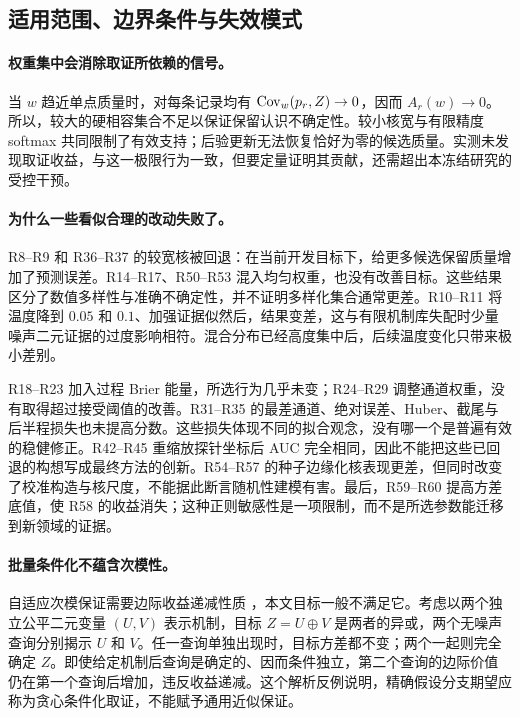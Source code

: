 \subsection{适用范围、边界条件与失效模式}
\label{sec:boundaries}
\paragraph{权重集中会消除取证所依赖的信号。}
当 $w$ 趋近单点质量时，对每条记录均有 $\operatorname{Cov}_w(p_r,Z)\to0$，因而 $A_r(w)\to0$。所以，较大的硬相容集合不足以保证保留认识不确定性。较小核宽与有限精度 softmax 共同限制了有效支持；后验更新无法恢复恰好为零的候选质量。实测未发现取证收益，与这一极限行为一致，但要定量证明其贡献，还需超出本冻结研究的受控干预。

\paragraph{为什么一些看似合理的改动失败了。}
R8--R9 和 R36--R37 的较宽核被回退：在当前开发目标下，给更多候选保留质量增加了预测误差。R14--R17、R50--R53 混入均匀权重，也没有改善目标。这些结果区分了数值多样性与准确不确定性，并不证明多样化集合通常更差。R10--R11 将温度降到 $0.05$ 和 $0.1$、加强证据似然后，结果变差，这与有限机制库失配时少量噪声二元证据的过度影响相符。混合分布已经高度集中后，后续温度变化只带来极小差别。

R18--R23 加入过程 Brier 能量，所选行为几乎未变；R24--R29 调整通道权重，没有取得超过接受阈值的改善。R31--R35 的最差通道、绝对误差、Huber、截尾与后半程损失也未提高分数。这些损失体现不同的拟合观念，没有哪一个是普遍有效的稳健修正。R42--R45 重缩放探针坐标后 AUC 完全相同，因此不能把这些已回退的构想写成最终方法的创新。R54--R57 的种子边缘化核表现更差，但同时改变了校准构造与核尺度，不能据此断言随机性建模有害。最后，R59--R60 提高方差底值，使 R58 的收益消失；这种正则敏感性是一项限制，而不是所选参数能迁移到新领域的证据。

\paragraph{批量条件化不蕴含次模性。}
自适应次模保证需要边际收益递减性质 \citep{golovin2011}，本文目标一般不满足它。考虑以两个独立公平二元变量 $(U,V)$ 表示机制，目标 $Z=U\oplus V$ 是两者的异或，两个无噪声查询分别揭示 $U$ 和 $V$。任一查询单独出现时，目标方差都不变；两个一起则完全确定 $Z$。即使给定机制后查询是确定的、因而条件独立，第二个查询的边际价值仍在第一个查询后增加，违反收益递减。这个解析反例说明，精确假设分支期望应称为贪心条件化取证，不能赋予通用近似保证。

